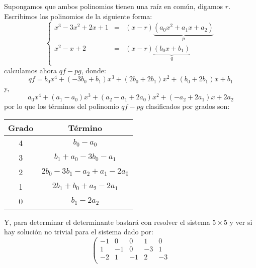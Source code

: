 \documentclass[12pt]{report}
\theoremstyle{largebreak}
\begin{document}
    \begin{sol}
        Supongamos que ambos polinomios tienen una raíz en común, digamos $r$. Escribimos los polinomios de la siguiente forma:
        \begin{equation*}
            \left\{
                \begin{array}{rcl}
                    x^3-3x^2+2x+1 & = & (x-r)\underset{p}{\underbrace{(a_0x^2+a_1x+a_2)}} \\
                    x^2-x+2 & = & (x-r)\underset{q}{\underbrace{(b_0x+b_1)}} \\
                \end{array}
            \right.
        \end{equation*}
        calculamos ahora $qf-pg$, donde:
        \begin{equation*}
            qf = b_0x^4+(-3b_0+b_1)x^3+(2b_0+2b_1)x^2+(b_0+2b_1)x+b_1
        \end{equation*}
        y,
        \begin{equation*}
            a_0x^4+(a_1-a_0)x^3+(a_2-a_1+2a_0)x^2+(-a_2+2a_1)x+2a_2
        \end{equation*}
        por lo que los términos del polinomio $qf-pg$ clasificados por grados son:
        \begin{center}
            \begin{tabular}{c | c}
                Grado & Término \\
                \hline
                4 & $b_0-a_0$ \\
                3 & $b_1+a_0-3b_0-a_1$ \\
                2 & $2b_0-3b_1-a_2+a_1-2a_0$ \\
                1 & $2b_1+b_0+a_2-2a_1$ \\
                0 & $b_1-2a_2$ \\
            \end{tabular}
        \end{center}
        Y, para determinar el determinante bastará con resolver el sistema $5\times 5$ y ver si hay solución no trivial para el sistema dado por:
        \begin{equation*}
            \left(
                \begin{array}{ccccc}
                    -1 & 0 & 0 & 1 & 0 \\
                    1 & -1 & 0 & -3 & 1 \\
                    -2 & 1 & -1 & 2 & -3 \\

\end{array}
\end{equation*}
\end{sol}
\end{document}
